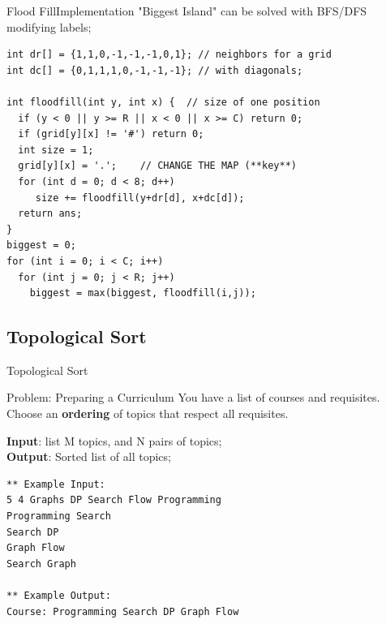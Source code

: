 \begin{frame}[fragile]{Flood Fill}{Implementation}
  "Biggest Island" can be solved with BFS/DFS modifying labels;

  {\smaller
  \begin{exampleblock}{}
\begin{verbatim}
int dr[] = {1,1,0,-1,-1,-1,0,1}; // neighbors for a grid
int dc[] = {0,1,1,1,0,-1,-1,-1}; // with diagonals;

int floodfill(int y, int x) {  // size of one position
  if (y < 0 || y >= R || x < 0 || x >= C) return 0;
  if (grid[y][x] != '#') return 0;
  int size = 1;
  grid[y][x] = '.';    // CHANGE THE MAP (**key**)
  for (int d = 0; d < 8; d++)
     size += floodfill(y+dr[d], x+dc[d]);
  return ans;
}
biggest = 0;
for (int i = 0; i < C; i++)
  for (int j = 0; j < R; j++)
    biggest = max(biggest, floodfill(i,j));
\end{verbatim}
  \end{exampleblock}
  }
\end{frame}

\subsection{Topological Sort}

\begin{frame}[fragile]{Topological Sort}
  \begin{block}{Problem: Preparing a Curriculum}
    You have a list of courses and requisites. Choose an {\bf ordering} of topics that respect all requisites.
    \bigskip

    {\bf Input}: list M topics, and N pairs of topics;\\
    {\bf Output}: Sorted list of all topics;
  \end{block}

{\smaller
\begin{verbatim}
** Example Input:
5 4 Graphs DP Search Flow Programming
Programming Search
Search DP
Graph Flow
Search Graph

** Example Output:
Course: Programming Search DP Graph Flow
\end{verbatim}

  }
\end{frame}

